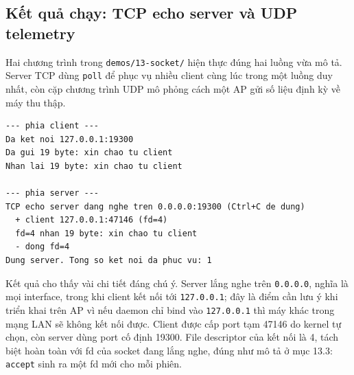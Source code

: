 \documentclass[11pt]{article}
\newcommand{\code}[1]{\texttt{#1}}
\begin{document}
\begin{center}
\end{center}

\subsection{Kết quả chạy: TCP echo server và UDP telemetry}

Hai chương trình trong \code{demos/13-socket/} hiện thực đúng hai luồng vừa mô tả. Server TCP dùng \code{poll} để phục vụ nhiều client cùng lúc trong một luồng duy nhất, còn cặp chương trình UDP mô phỏng cách một AP gửi số liệu định kỳ về máy thu thập.

\begin{lstlisting}[caption={TCP echo: server và client chạy song song}]
--- phia client ---
Da ket noi 127.0.0.1:19300
Da gui 19 byte: xin chao tu client
Nhan lai 19 byte: xin chao tu client

--- phia server ---
TCP echo server dang nghe tren 0.0.0.0:19300 (Ctrl+C de dung)
  + client 127.0.0.1:47146 (fd=4)
  fd=4 nhan 19 byte: xin chao tu client
  - dong fd=4
Dung server. Tong so ket noi da phuc vu: 1
\end{lstlisting}

Kết quả cho thấy vài chi tiết đáng chú ý. Server lắng nghe trên \code{0.0.0.0}, nghĩa là mọi interface, trong khi client kết nối tới \code{127.0.0.1}; đây là điểm cần lưu ý khi triển khai trên AP vì nếu daemon chỉ bind vào \code{127.0.0.1} thì máy khác trong mạng LAN sẽ không kết nối được. Client được cấp port tạm 47146 do kernel tự chọn, còn server dùng port cố định 19300. File descriptor của kết nối là 4, tách biệt hoàn toàn với fd của socket đang lắng nghe, đúng như mô tả ở mục 13.3: \code{accept} sinh ra một fd mới cho mỗi phiên.
\end{document}
